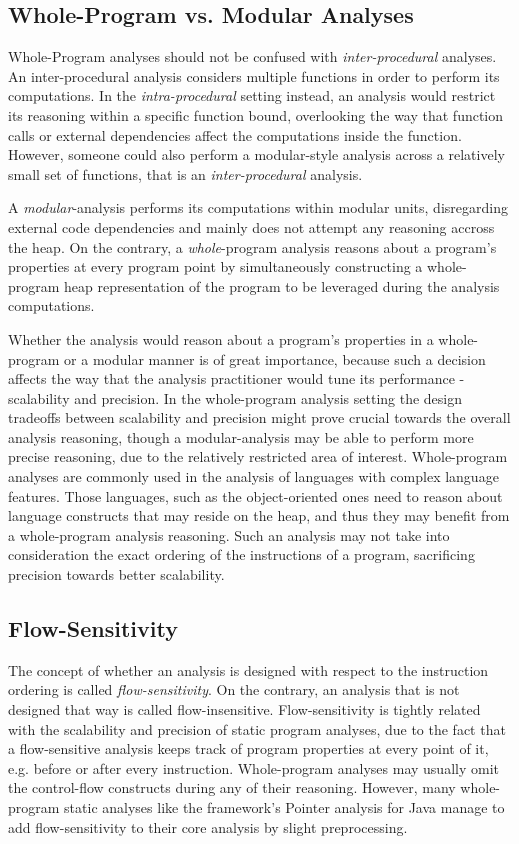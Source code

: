 \subsection{Whole-Program vs. Modular Analyses}

Whole-Program analyses should not be confused with \emph{inter-procedural} analyses.
An inter-procedural analysis considers multiple functions in order to perform
its computations. In the \emph{intra-procedural} setting instead, an analysis would
restrict its reasoning within a specific function bound, overlooking the way
that function calls or external dependencies affect the computations inside the function.
However, someone could also perform a modular-style analysis across a relatively small
set of functions, that is an \emph{inter-procedural} analysis.

A \emph{modular}-analysis performs its computations within modular
units, disregarding external code dependencies and mainly does not attempt
any reasoning accross the heap. On the contrary, a \emph{whole}-program analysis
reasons about a program's properties at every program point by
simultaneously constructing a whole-program heap representation of the program
to be leveraged during the analysis computations.

Whether the analysis would reason about a program's properties in a whole-program
or a modular manner is of great importance, because such a decision affects the
way that the analysis practitioner would tune its performance - scalability and
precision. In the whole-program analysis setting the design tradeoffs between
scalability and precision might prove crucial towards the overall analysis
reasoning, though a modular-analysis may be able to perform more precise reasoning,
due to the relatively restricted area of interest. Whole-program analyses are
commonly used in the analysis of languages with complex language features. Those
languages, such as the object-oriented ones need to reason about language constructs
that may reside on the heap, and thus they may benefit from a whole-program analysis
reasoning. Such an analysis may not take into consideration the
exact ordering of the instructions of a program, sacrificing precision towards
better scalability.

\subsection{Flow-Sensitivity}

The concept of whether an analysis is designed with respect to
the instruction ordering is called \emph{flow-sensitivity}.
On the contrary, an analysis that is not designed that way is
called flow-insensitive. Flow-sensitivity is tightly related with
the scalability and precision of static program analyses, due to the
fact that a flow-sensitive analysis keeps track of program properties
at every point of it, e.g. before or after every instruction.
Whole-program analyses may usually omit the control-flow constructs
during any of their reasoning. However, many whole-program static
analyses like the \doop{} framework's Pointer analysis for Java
manage to add flow-sensitivity to their core analysis by slight
preprocessing\cite{points-to15}.

